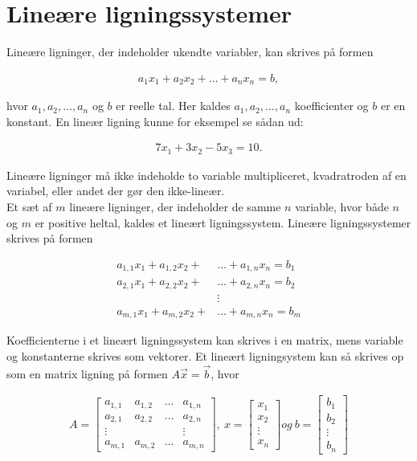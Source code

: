 \section{Lineære ligningssystemer}\label{afsnit:lign_sys}
Lineære ligninger, der indeholder ukendte variabler, kan skrives på formen

\begin{align*}
a_1x_1+a_2x_2+ \dots +a_nx_n = b,
\end{align*}

hvor $a_1, a_2, \dots , a_n$ og $b$ er reelle tal. 
Her kaldes $a_1,a_2, \dots , a_n$ koefficienter og $b$ er en konstant. En lineær ligning kunne for eksempel se sådan ud:

\begin{align*}
7x_1+3x_2-5x_3 = 10.
\end{align*}

Lineære ligninger må ikke indeholde to variable multipliceret, kvadratroden af en variabel, eller andet der gør den ikke-lineær. \\
Et sæt af $m$ lineære ligninger, der indeholder de samme $n$ variable, hvor både $n$ og $m$ er positive heltal, kaldes et lineært ligningssystem. Lineære ligningssystemer skrives på formen

\begin{align*}
a_{1,1}x_1+a_{1,2}x_2+ &\dots +a_{1,n}x_n = b_1\\
a_{2,1}x_1+a_{2,2}x_2+ &\dots +a_{2,n}x_n = b_2\\
&\vdots \\
a_{m,1}x_1+a_{m,2}x_2+ &\dots +a_{m,n}x_n = b_m
\end{align*}

Koefficienterne i et lineært ligningssystem kan skrives i en matrix, mens variable og konstanterne skrives som vektorer. Et lineært ligningsystem kan så skrives op som en matrix ligning på formen $A \vec{x} = \vec{b}$, hvor

\begin{align*}
A= \begin{bmatrix}
a_{1,1} & a_{1,2} & \dots & a_{1,n} \\
a_{2,1} & a_{2,2} & \dots & a_{2,n} \\
\vdots  &         &       & \vdots  \\
a_{m,1} & a_{m,2} & \dots & a_{m,n}
\end{bmatrix}, \ 
x= \begin{bmatrix}
x_1 \\
x_2 \\
\vdots \\
x_n
\end{bmatrix} og \ 
b= \begin{bmatrix}
b_1 \\
b_2 \\
\vdots \\
b_n
\end{bmatrix}
\end{align*}

